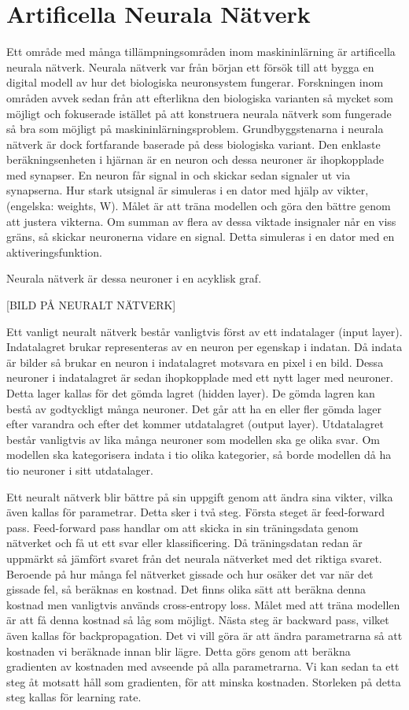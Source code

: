\documentclass{kththesis}
\begin{document}
  \section{Artificella Neurala Nätverk}
  Ett område med många tillämpningsområden inom maskininlärning är artificella neurala nätverk.
  Neurala nätverk var från början ett försök till att bygga en digital modell av hur det biologiska neuronsystem fungerar.
  Forskningen inom områden avvek sedan från att efterlikna den biologiska varianten så mycket som möjligt och fokuserade istället på att konstruera neurala nätverk som fungerade så bra som möjligt på maskininlärningsproblem.
  Grundbyggstenarna i neurala nätverk är dock fortfarande baserade på dess biologiska variant.
  Den enklaste beräkningsenheten i hjärnan är en neuron och dessa neuroner är ihopkopplade med synapser.
  En neuron får signal in och skickar sedan signaler ut via synapserna.
  Hur stark utsignal är simuleras i en dator med hjälp av vikter, (engelska: weights, W).
  Målet är att träna modellen och göra den bättre genom att justera vikterna.
  Om summan av flera av dessa viktade insignaler når en viss gräns, så skickar neuronerna vidare en signal.
  Detta simuleras i en dator med en aktiveringsfunktion.

  Neurala nätverk är dessa neuroner i en acyklisk graf.

  [BILD PÅ NEURALT NÄTVERK]

  Ett vanligt neuralt nätverk består vanligtvis först av ett indatalager (input layer). Indatalagret brukar representeras av en neuron per egenskap i indatan. 
  Då indata är bilder så brukar en neuron i indatalagret motsvara en pixel i en bild.
  Dessa neuroner i indatalagret är sedan ihopkopplade med ett nytt lager med neuroner.
  Detta lager kallas för det gömda lagret (hidden layer).
  De gömda lagren kan bestå av godtyckligt många neuroner.
  Det går att ha en eller fler gömda lager efter varandra och efter det kommer utdatalagret (output layer).
  Utdatalagret består vanligtvis av lika många neuroner som modellen ska ge olika svar.
  Om modellen ska kategorisera indata i tio olika kategorier, så borde modellen då ha tio neuroner i sitt utdatalager.

  Ett neuralt nätverk blir bättre på sin uppgift genom att ändra sina vikter, vilka även kallas för parametrar. Detta sker i två steg. Första steget är feed-forward pass. Feed-forward pass handlar om att skicka in sin träningsdata genom nätverket och få ut ett svar eller klassificering.
  Då träningsdatan redan är uppmärkt så jämfört svaret från det neurala nätverket med det riktiga svaret. Beroende på hur många fel nätverket gissade och hur osäker det var när det gissade fel, så beräknas en kostnad. Det finns olika sätt att beräkna denna kostnad men vanligtvis används cross-entropy loss. Målet med att träna modellen är att få denna kostnad så låg som möjligt. Nästa steg är backward pass, vilket även kallas för backpropagation. Det vi vill göra är att ändra parametrarna så att kostnaden vi beräknade innan blir lägre. Detta görs genom att beräkna gradienten av kostnaden med avseende på alla parametrarna. Vi kan sedan ta ett steg åt motsatt håll som gradienten, för att minska kostnaden. Storleken på detta steg kallas för learning rate.
\end{document}
